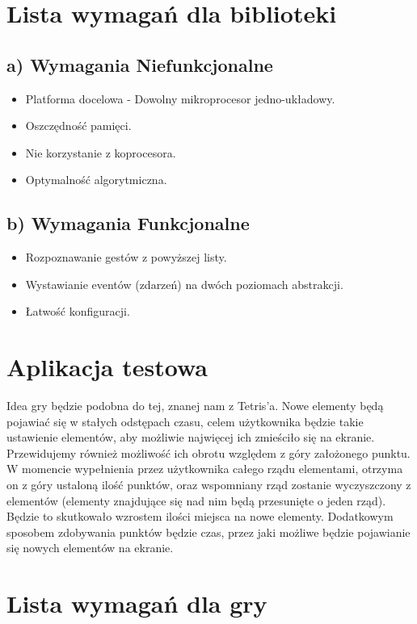 \documentclass[a4paper,12pt]{article}
\begin{document}
\section{\Large Lista wymagań dla biblioteki}
	\subsection*{a) Wymagania Niefunkcjonalne}
	\begin{itemize}
		\item Platforma docelowa - Dowolny mikroprocesor jedno-układowy.
		\item Oszczędność pamięci.
		\item Nie korzystanie z koprocesora.
		\item Optymalność algorytmiczna.
	\end{itemize}
   		
	\subsection*{b) Wymagania Funkcjonalne}
	\begin{itemize}
		\item Rozpoznawanie gestów z powyższej listy.
		\item Wystawianie eventów (zdarzeń) na dwóch poziomach abstrakcji.
		\item Łatwość konfiguracji.
	\end{itemize}

\section{\Large Aplikacja testowa}
Idea gry będzie podobna do tej, znanej nam z Tetris'a. Nowe elementy będą pojawiać się w stałych odstępach czasu, celem użytkownika będzie takie ustawienie elementów, aby możliwie najwięcej ich zmieściło się na ekranie. Przewidujemy również możliwość ich obrotu względem z góry założonego punktu. W momencie wypełnienia przez użytkownika całego rządu elementami, otrzyma on z góry ustaloną ilość punktów, oraz wspomniany rząd zostanie wyczyszczony z elementów (elementy znajdujące się nad nim będą przesunięte o jeden rząd). Będzie to skutkowało wzrostem ilości miejsca na nowe elementy. Dodatkowym sposobem zdobywania punktów będzie czas, przez jaki możliwe będzie pojawianie się nowych elementów na ekranie.

\section{\Large Lista wymagań dla gry}
\end{document}
